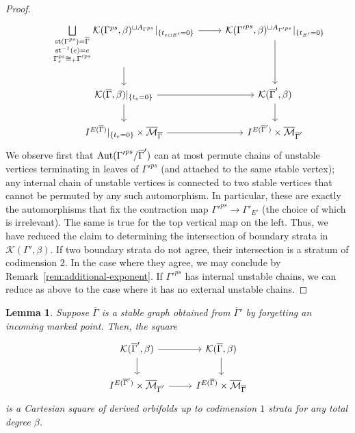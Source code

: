 \documentclass[11pt,psamsfonts, oneside, reqno]{amsart}
\newcommand{\cc}[1]{\overline{#1}}
\newcommand{\inv}{^{-1}}
\newcommand{\djun}[1]{\bigsqcup\limits_{#1}}
\newcommand{\Mbar}{\overline{\mathcal M}}
\newcommand{\Aut}{\normalfont\text{Aut}}
\newcommand{\cK}{\mathcal{K}}
\newcommand{\stb}{\normalfont\text{st}}
\newcommand{\ov}[1]{\overline{#1}}
\newtheorem{lemma}[theorem]{Lemma}
\theoremstyle{definition}
\theoremstyle{remark}
\numberwithin{equation}{section}
\begin{document}
\begin{proof}
	\begin{equation}\label{dig:contraction-square-expanded}
		\begin{tikzcd}
			&\djun{\substack{\stb(\Gamma^{ps}) = \ov\Gamma\\ \stb\inv(e) = e\\\Gamma^{ps}_e \cong_+ {\Gamma'}^{ps}}} \cK(\Gamma^{ps},\beta)^{\sqcup A_{\Gamma^{ps}}}|_{\{t_{e\sqcup E'} = 0\}} \arrow[r] \arrow[d] & \cK({\Gamma'}^{ps},\beta)^{\sqcup A_{{\Gamma'}^{ps}}}|_{\{t_{E'} = 0\}} \arrow[d]\\
			&\cK(\cc \Gamma,\beta)|_{\{t_e = 0\}} \arrow[r] \arrow[d] & \cK(\cc \Gamma',\beta)\arrow[d]\\
			&I^{E(\cc \Gamma)}|_{\{t_e = 0\}}\times \Mbar_{\cc \Gamma}  \arrow[r] & I^{E(\cc \Gamma')} \times \Mbar_{\cc \Gamma'}  
		\end{tikzcd}
	\end{equation}
	We observe first that $\Aut({\Gamma'}^{ps}/\ov\Gamma')$ can at most permute chains of unstable vertices terminating in leaves of ${\Gamma'}^{ps}$ (and attached to the same stable vertex); any internal chain of unstable vertices is connected to two stable vertices that cannot be permuted by any such automorphism. In particular, these are exactly the automorphisms that fix the contraction map ${\Gamma'}^{ps}\to \Gamma'_{E'}$ (the choice of which is irrelevant). The same is true for the top vertical map on the left. Thus, we have reduced the claim to determining the intersection of boundary strata in $\cK(\Gamma',\beta)$. If two boundary strata do not agree, their intersection is a stratum of codimension $2$. In the case where they agree, we may conclude by Remark~\ref{rem:additional-exponent}. 
	If ${\Gamma'}^{ps}$ has internal unstable chains, we can reduce as above to the case where it has no external unstable chains.
\end{proof}



\begin{lemma}\label{lem:forgetful-map-fibre-product}
	Suppose $\ov\Gamma$ is a stable graph obtained from $\ov\Gamma'$ by forgetting an incoming marked point. Then, the square 
	\begin{equation}\label{dig:forgetful-map-square}
		\begin{tikzcd}
			\cK(\ov\Gamma',\beta) \arrow[r] \arrow[d] & \cK(\ov{\Gamma},\beta)\arrow[d]\\
			I^{E(\cc \Gamma')}\times \Mbar_{\cc \Gamma'} \arrow[r] &I^{E(\cc \Gamma)}\times\Mbar_{\cc \Gamma} 
		\end{tikzcd}
	\end{equation}
	is a Cartesian square of derived orbifolds up to codimension $1$ strata for any total degree $\beta$.
\end{lemma}
\end{document}
